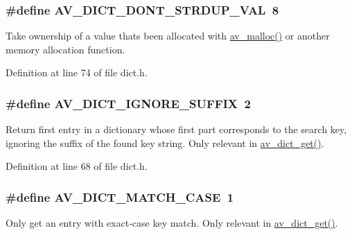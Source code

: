 \subsubsection[{\texorpdfstring{A\+V\+\_\+\+D\+I\+C\+T\+\_\+\+D\+O\+N\+T\+\_\+\+S\+T\+R\+D\+U\+P\+\_\+\+V\+AL}{AV_DICT_DONT_STRDUP_VAL}}]{\setlength{\rightskip}{0pt plus 5cm}\#define A\+V\+\_\+\+D\+I\+C\+T\+\_\+\+D\+O\+N\+T\+\_\+\+S\+T\+R\+D\+U\+P\+\_\+\+V\+AL~8}\hypertarget{group__lavu__dict_ga7a9a991cb7837b10ffd44725263de425}{}\label{group__lavu__dict_ga7a9a991cb7837b10ffd44725263de425}
Take ownership of a value that\textquotesingle{}s been allocated with \hyperlink{group__lavu__mem_gacbca30ebc510a7e4156d66e7aceb2dc8}{av\+\_\+malloc()} or another memory allocation function. 

Definition at line 74 of file dict.\+h.

\subsubsection[{\texorpdfstring{A\+V\+\_\+\+D\+I\+C\+T\+\_\+\+I\+G\+N\+O\+R\+E\+\_\+\+S\+U\+F\+F\+IX}{AV_DICT_IGNORE_SUFFIX}}]{\setlength{\rightskip}{0pt plus 5cm}\#define A\+V\+\_\+\+D\+I\+C\+T\+\_\+\+I\+G\+N\+O\+R\+E\+\_\+\+S\+U\+F\+F\+IX~2}\hypertarget{group__lavu__dict_ga341bbd1ea599dfb0510f419e5272fecc}{}\label{group__lavu__dict_ga341bbd1ea599dfb0510f419e5272fecc}
Return first entry in a dictionary whose first part corresponds to the search key, ignoring the suffix of the found key string. Only relevant in \hyperlink{group__lavu__dict_ga8140aee3afe5d5ccdf2d4a5eabb4a710}{av\+\_\+dict\+\_\+get()}. 

Definition at line 68 of file dict.\+h.

\subsubsection[{\texorpdfstring{A\+V\+\_\+\+D\+I\+C\+T\+\_\+\+M\+A\+T\+C\+H\+\_\+\+C\+A\+SE}{AV_DICT_MATCH_CASE}}]{\setlength{\rightskip}{0pt plus 5cm}\#define A\+V\+\_\+\+D\+I\+C\+T\+\_\+\+M\+A\+T\+C\+H\+\_\+\+C\+A\+SE~1}\hypertarget{group__lavu__dict_gad9cbc53cec515b72ae7caa2e194c6bc0}{}\label{group__lavu__dict_gad9cbc53cec515b72ae7caa2e194c6bc0}
Only get an entry with exact-\/case key match. Only relevant in \hyperlink{group__lavu__dict_ga8140aee3afe5d5ccdf2d4a5eabb4a710}{av\+\_\+dict\+\_\+get()}. 

